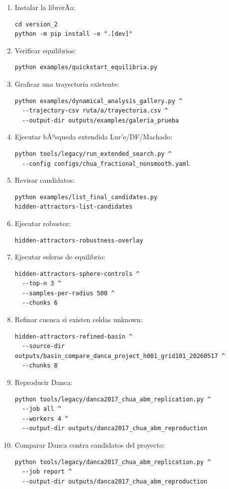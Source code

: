 \documentclass[11pt]{article}
\DeclareRobustCommand{\codepath}[1]{\begingroup\Urlmuskip=0mu plus 2mu\path{#1}\endgroup}
\def\codepath#1{#1}%
\begin{document}
\begin{enumerate}
\item Instalar la librerÃ­a:
\begin{lstlisting}
cd version_2
python -m pip install -e ".[dev]"
\end{lstlisting}

\item Verificar equilibrios:
\begin{lstlisting}
python examples/quickstart_equilibria.py
\end{lstlisting}

\item Graficar una trayectoria existente:
\begin{lstlisting}
python examples/dynamical_analysis_gallery.py ^
  --trajectory-csv ruta/a/trayectoria.csv ^
  --output-dir outputs/examples/galeria_prueba
\end{lstlisting}

\item Ejecutar bÃºsqueda extendida Lur'e/DF/Machado:
\begin{lstlisting}
python tools/legacy/run_extended_search.py ^
  --config configs/chua_fractional_nonsmooth.yaml
\end{lstlisting}

\item Revisar candidatos:
\begin{lstlisting}
python examples/list_final_candidates.py
hidden-attractors-list-candidates
\end{lstlisting}

\item Ejecutar robustez:
\begin{lstlisting}
hidden-attractors-robustness-overlay
\end{lstlisting}

\item Ejecutar esferas de equilibrio:
\begin{lstlisting}
hidden-attractors-sphere-controls ^
  --top-n 3 ^
  --samples-per-radius 500 ^
  --chunks 6
\end{lstlisting}

\item Refinar cuenca si existen celdas \codepath{unknown}:
\begin{lstlisting}
hidden-attractors-refined-basin ^
  --source-dir outputs/basin_compare_danca_project_h001_grid101_20260517 ^
  --chunks 8
\end{lstlisting}

\item Reproducir Danca:
\begin{lstlisting}
python tools/legacy/danca2017_chua_abm_replication.py ^
  --job all ^
  --workers 4 ^
  --output-dir outputs/danca2017_chua_abm_reproduction
\end{lstlisting}

\item Comparar Danca contra candidatos del proyecto:
\begin{lstlisting}
python tools/legacy/danca2017_chua_abm_replication.py ^
  --job report ^
  --output-dir outputs/danca2017_chua_abm_reproduction
\end{lstlisting}
\end{enumerate}
\end{document}
